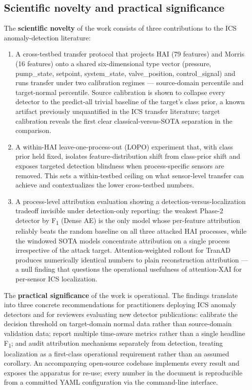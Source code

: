 \subsection{Scientific novelty and practical significance}
\label{sec:novelty-significance}

The \textbf{scientific novelty} of the work consists of three contributions to the ICS anomaly-detection literature:

\begin{enumerate}
  \item A cross-testbed transfer protocol that projects HAI (79 features) and Morris (16 features) onto a shared six-dimensional type vector (pressure, pump\_state, setpoint, system\_state, valve\_position, control\_signal) and runs transfer under two calibration regimes --- source-domain percentile and target-normal percentile.  Source calibration is shown to collapse every detector to the predict-all trivial baseline of the target's class prior, a known artifact previously unquantified in the ICS transfer literature; target calibration reveals the first clear classical-versus-SOTA separation in the comparison.
  \item A within-HAI leave-one-process-out (LOPO) experiment that, with class prior held fixed, isolates feature-distribution shift from class-prior shift and exposes targeted detection blindness when process-specific sensors are removed.  This sets a within-testbed ceiling on what sensor-level transfer can achieve and contextualizes the lower cross-testbed numbers.
  \item A process-level attribution evaluation showing a detection-versus-localization tradeoff invisible under detection-only reporting: the weakest Phase-2 detector by F\textsubscript{1} (Dense AE) is the only model whose per-feature attribution reliably beats the random baseline on all three attacked HAI processes, while the windowed SOTA models concentrate attribution on a single process irrespective of the attack target.  Attention-weighted rollout for TranAD produces numerically identical numbers to plain reconstruction attribution --- a null finding that questions the operational usefulness of attention-XAI for per-sensor ICS localization.
\end{enumerate}

The \textbf{practical significance} of the work is operational.  The findings translate into three concrete recommendations for practitioners deploying ICS anomaly detectors and for reviewers evaluating new detector publications: calibrate the decision threshold on target-domain normal data rather than source-domain validation data; report multiple time-aware metrics rather than a single headline F\textsubscript{1}; and audit attribution mechanisms separately from detection, treating localization as a first-class operational requirement rather than an assumed corollary.  An accompanying open-source codebase implements every result and exposes the apparatus for re-use; every number in the document is reproducible from a committed YAML configuration via the  command-line interface.

